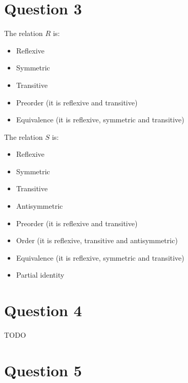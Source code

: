 \documentclass[a4paper, fleqn]{article}
\begin{document}
\section*{Question 3}
The relation $R$ is:
\begin{itemize}
 \item Reflexive
 \item Symmetric
 \item Transitive
 \item Preorder (it is reflexive and transitive)
 \item Equivalence (it is reflexive, symmetric and transitive)
\end{itemize}
The relation $S$ is:
\begin{itemize}
 \item Reflexive
 \item Symmetric
 \item Transitive
 \item Antisymmetric
 \item Preorder (it is reflexive and transitive)
 \item Order (it is reflexive, transitive and antisymmetric)
 \item Equivalence (it is reflexive, symmetric and transitive)
 \item Partial identity
\end{itemize}

\section*{Question 4}
TODO

\section*{Question 5}
\end{document}
